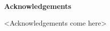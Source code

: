 \begin{center}
    {\large \textbf{Acknowledgements}}
\end{center}

<Acknowledgements come here>

\clearpage